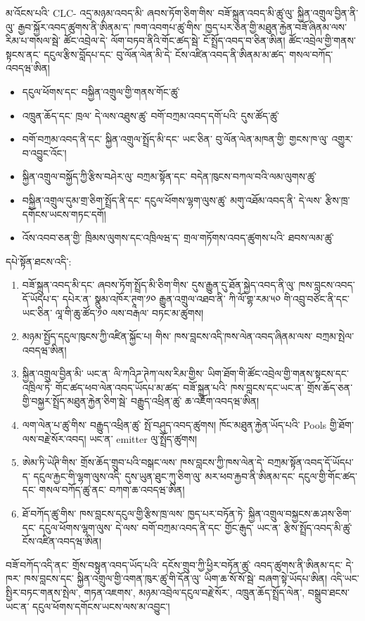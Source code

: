 \documentclass[11pt]{article}
\begin{document}
མ་འོངས་པའི་ CLC- འདྲ་མཉམ་འབད་མི་ ཞབས་ཏོག་ཅིག་གིས་ བཟོ་སྐྲུན་འབད་མི་ཚུ་ལུ་ སྐྱིན་འགྲུལ་བྱིན་ནི་ལུ་ རྒྱབ་སྐྱོར་འབད་ཚུགས་ནི་ཨིནམ་ད་ ཁག་འབགཔ་ཚུ་གིས་ ཁྱད་པར་ཅན་གྱི་མཐུན་རྐྱེན་བཟོ་ཞིནམ་ལས་ རིམ་པ་གསལ་སྦེ་ ཚོང་འབྲེལ་དེ་ ལོག་བཏབ་ནིའི་གོང་ཚད་སྦེ་ ངོ་སྤྲོད་འབད་བ་ཅིན་ཨིན། ཚོང་འབྲེལ་གྱི་གནས་སྟངས་ནང་ དངུལ་རྩིས་བློདཔ་དང་ བུ་ལོན་ལེན་མི་དེ་ ངོས་འཛིན་འབད་ནི་ཨིནམ་མ་ཚད་ གསལ་བཀོད་འབདཝ་ཨིན།

\begin{itemize}[leftmargin=*]
\item དངུལ་ཕོགས་དང་ བསྐྱིན་འགྲུལ་གྱི་གནས་གོང་ཚུ་
\item འཁྲུན་ཆོད་དང་ ཁྲལ་ དེ་ལས་འཐུས་ཚུ་ བགོ་བཀྲམ་འབད་དགོ་པའི་ དུས་ཚོད་ཚུ་
\item བགོ་བཀྲམ་འབད་ནི་དང་ སྐྱིན་འགྲུལ་སྤྲོད་མི་དང་ ཡང་ཅིན་ བུ་ལོན་ལེན་མཁན་གྱི་ གྱངས་ཁ་ལུ་ འགྱུར་བ་འབྱུང་འོང་།
\item སྐྱིན་འགྲུལ་བསྐྱོད་ཀྱི་རྩིས་བཤེར་ལུ་ བཀྲམ་སྟོན་དང་ བདེན་ཁུངས་བཀལ་བའི་ལམ་ལུགས་ཚུ་
\item བསྐྱིན་འགྲུལ་དུམ་གྲ་ཅིག་སྤྲོད་ནི་དང་ དངུལ་ཕོགས་ལྷག་ལུས་ཚུ་ མགུ་འཐོམ་འབད་ནི་ དེ་ལས་ རྩིས་ཁྲ་དགོངས་ཡངས་གཏང་དགོ།
\item འོས་འབབ་ཅན་གྱི་ ཁྲིམས་ལུགས་དང་འཁྲིལཝ་ད་ གྲལ་གཏོགས་འབད་ཚུགས་པའི་ ཐབས་ལམ་ཚུ་
\end{itemize}
དཔེ་སྟོན་ཐངས་འདི་:

\begin{enumerate}[leftmargin=*]
\item བཟོ་སྐྲུན་འབད་མི་དང་ ཞབས་ཏོག་སྤྲོད་མི་ཅིག་གིས་ དུས་རྒྱུན་དུ་ཐོན་སྐྱེད་འབད་ནི་ལུ་ ཁས་བླངས་འབད་དོ་ཡོདཔ་ད་ དཔེར་ན་ སྣུམ་འཁོར་ཊཱག་༡༠ རྒྱུན་འགྲུལ་འཐབ་ནི་ ཀི་ལོ་གྷ་རམ་༥༠ གི་འབྲུ་བཙོང་ནི་དང་ ཡང་ཅིན་ ལཱ་གི་ཆུ་ཚོད་༡༠ ལས་བརྒལ་ བཏང་མ་ཚུགས།
\item མཉམ་སྤྱོད་དངུལ་ཁུངས་ཀྱི་འཛིན་སྐྱོང་པ། གིས་ ཁས་བླངས་འདི་ཁས་ལེན་འབད་ཞིནམ་ལས་ བཀྲམ་སྤེལ་འབདཝ་ཨིན།
\item སྐྱིན་འགྲུལ་བྱིན་མི་ ཡང་ན་ ལི་ཀའིཌ་ཊེཀ་ལས་རིམ་གྱིས་ ཡིག་ཐོག་གི་ཚོང་འབྲེལ་གྱི་གནས་སྟངས་དང་འཁྲིལ་ཏེ་ གོང་ཚད་ཕབ་ལེན་འབད་ཡོདཔ་མ་ཚད་ བཟོ་སྐྲུན་པའི་ ཁས་བླངས་དང་ཡང་ན་ གྲོས་ཆོད་ཅན་གྱི་བསྐྱར་སྤྲོད་མཐུན་རྐྱེན་ཅིག་སྦེ་ བརྒྱུད་འཕྲིན་ཚུ་ ཆ་འཇོག་འབདཝ་ཨིན།
\item ལག་ལེན་པ་ཚུ་གིས་ བརྒྱུད་འཕྲིན་ཚུ་ སྤོ་བཤུད་འབད་ཚུགས། ཁོང་མཐུན་རྐྱེན་ཡོད་པའི་ Pools གྱི་ཐོག་ལས་བརྗེ་སོར་འབད། ཡང་ན་ emitter ལུ་སྤྲོད་ཚུགས།
\item ཨེམ་ཏི་ཡེཊི་གིས་ གྲོས་ཆོད་གྲུབ་པའི་བསྒང་ལས་ ཁས་བླངས་ཀྱི་ཁས་ལེན་དེ་ བཀྲམ་སྟོན་འབད་དོ་ཡོདཔ་ད་ དངུལ་རྐྱང་གི་ལྷག་ལུས་འདི་ དུས་ཡུན་ཐུང་ཀུ་ཅིག་ལུ་ མར་ཕབ་རྐྱབ་ནི་ཨིནམ་དང་ དངུལ་གྱི་གོང་ཚད་དང་ གསལ་བཀོད་ཚུ་ནང་ བཀག་ཆ་འབདཝ་ཨིན།
\item ཐོ་བཀོད་ཚུ་གིས་ ཁས་བླངས་དངུལ་གྱི་རྩིས་ཁྲ་ལས་ ཁྱད་པར་བཏོན་ཏེ་ སྐྱིན་འགྲུལ་བསྐྱངས་ཆ་ཤས་ཅིག་དང་ དངུལ་ཕོགས་ལྷག་ལུས་ དེ་ལས་ བགོ་བཀྲམ་འབད་ནི་དང་ གྱོང་རྒུད་ ཡང་ན་ རྩིས་སྤྲོད་འབད་མི་ཚུ་ ངོས་འཛིན་འབདཝ་ཨིན།
\end{enumerate}
བཟོ་བཀོད་འདི་ནང་ གྲོས་བསྟུན་འབད་ཡོད་པའི་ དངོས་གྲུབ་ཀྱི་ཕྱིར་བཏོན་ཚུ་ འབད་ཚུགས་ནི་ཨིནམ་དང་ དེ་ཁར་ ཁས་བླངས་དང་ སྐྱིན་འགྲུལ་གྱི་འགན་ཁུར་ཚུ་གི་དོན་ལུ་ ཡིག་ཆ་སོ་སོ་སྦེ་ བཞག་སྟེ་ཡོདཔ་ཨིན། འདི་ཡང་ སྤྱིར་བཏང་གནས་སྤེལ་, གཏན་འཇགས་, མཉམ་འབྲེལ་དངུལ་བརྗེ་སོར་, འཁྲུན་ཆོད་སྤྲོད་ལེན་, བསྒྲུབ་ཐངས་ ཡང་ན་ དངུལ་ཕོགས་དགོངས་ཡངས་ལས་མ་འབྱུང་།
\end{document}
